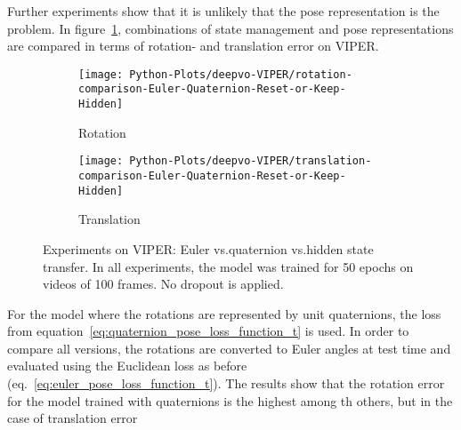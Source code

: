 		Further experiments show that it is unlikely that the pose representation is the problem.
		In figure~\ref{fig:viper-euler-vs-quat-vs-hidden-state-keep-or-reset}, combinations of state management and pose representations are compared in terms of rotation- and translation error on VIPER.
		\begin{figure}
			\centering
			\begin{subfigure}[b]{0.5\linewidth}
				\centering
				\texttt{[image: Python-Plots/deepvo-VIPER/rotation-comparison-Euler-Quaternion-Reset-or-Keep-Hidden]}
				\caption{Rotation}
			\end{subfigure}%
			\begin{subfigure}[b]{0.5\linewidth}
				\centering
				\texttt{[image: Python-Plots/deepvo-VIPER/translation-comparison-Euler-Quaternion-Reset-or-Keep-Hidden]}
				\caption{Translation}
			\end{subfigure}%
			\caption[Experiments on VIPER: Euler vs.\@ quaternion vs.\@ hidden state transfer]
					{Experiments on VIPER: Euler vs.\@ quaternion vs.\@ hidden state transfer.
					 In all experiments, the model was trained for 50 epochs on videos of 100 frames.
					 No dropout is applied.
					 \label{fig:viper-euler-vs-quat-vs-hidden-state-keep-or-reset}}
		\end{figure}
		For the model where the rotations are represented by unit quaternions, the loss from equation~\ref{eq:quaternion_pose_loss_function_t} is used.
		In order to compare all versions, the rotations are converted to Euler angles at test time and evaluated using the Euclidean loss as before (eq.\@~\ref{eq:euler_pose_loss_function_t}).
		The results show that the rotation error for the model trained with quaternions is the highest among th others, but in the case of translation error
		
		
